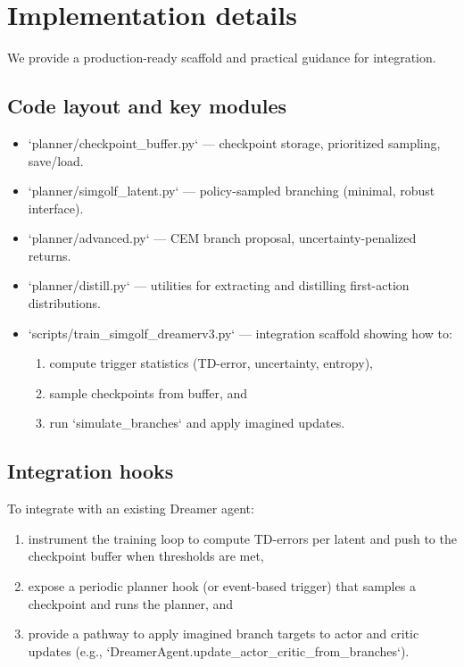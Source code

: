 \documentclass{article}
\begin{document}
\section{Implementation details}
We provide a production-ready scaffold and practical guidance for integration.

\subsection{Code layout and key modules}
\begin{itemize}
\item `planner/checkpoint_buffer.py` — checkpoint storage, prioritized sampling, save/load.
\item `planner/simgolf_latent.py` — policy-sampled branching (minimal, robust interface).
\item `planner/advanced.py` — CEM branch proposal, uncertainty-penalized returns.
\item `planner/distill.py` — utilities for extracting and distilling first-action distributions.
\item `scripts/train_simgolf_dreamerv3.py` — integration scaffold showing how to:
  \begin{enumerate}
  \item compute trigger statistics (TD-error, uncertainty, entropy),
  \item sample checkpoints from buffer, and
  \item run `simulate_branches` and apply imagined updates.
  \end{enumerate}
\end{itemize}

\subsection{Integration hooks}
To integrate with an existing Dreamer agent:
\begin{enumerate}
\item instrument the training loop to compute TD-errors per latent and push to the checkpoint buffer when thresholds are met,
\item expose a periodic planner hook (or event-based trigger) that samples a checkpoint and runs the planner, and
\item provide a pathway to apply imagined branch targets to actor and critic updates (e.g., `DreamerAgent.update_actor_critic_from_branches`).
\end{enumerate}
\end{document}
